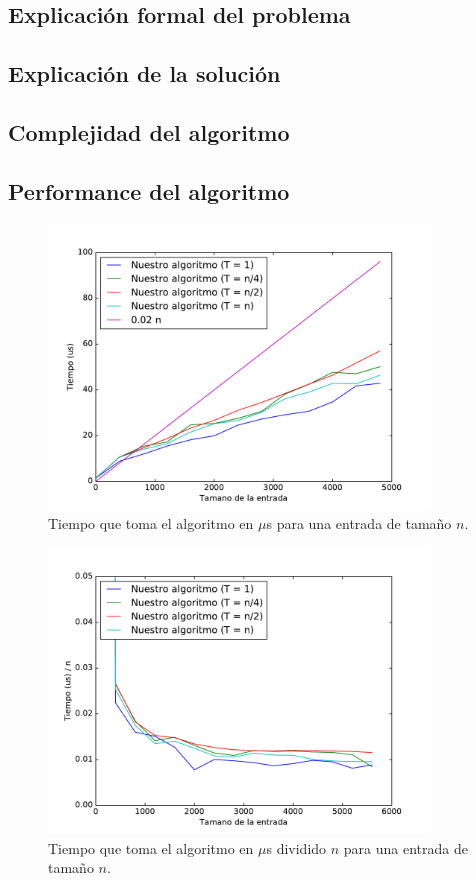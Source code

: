 \subsection{Explicación formal del problema}

\subsection{Explicación de la solución}

\subsection{Complejidad del algoritmo}

\subsection{Performance del algoritmo}

\begin{figure}[H]
 \centering
	\includegraphics[width=0.9\textwidth]{img/tiempos/genkidama1.pdf}
	\caption{\footnotesize Tiempo que toma el algoritmo en $\mu$s para una entrada de tamaño $n$.}
	\label{fig:genkidama-tiempos1}
\end{figure}


\begin{figure}[H]
 \centering
	\includegraphics[width=0.9\textwidth]{img/tiempos/genkidama2.pdf}
	\caption{\footnotesize Tiempo que toma el algoritmo en $\mu$s dividido $n$ para una entrada de tamaño $n$.}
	\label{fig:genkidama-tiempos2}
\end{figure}

